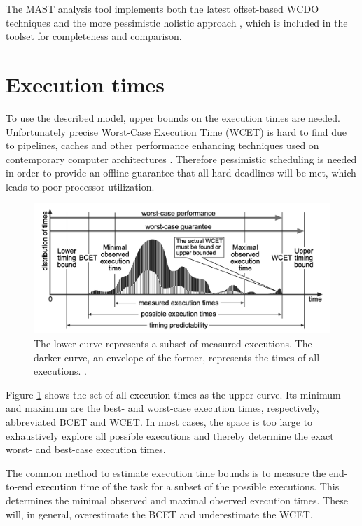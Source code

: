 \documentclass{article}
\begin{document}
The MAST analysis tool implements both the latest offset-based WCDO techniques and the more pessimistic holistic approach \cite{mast}, which is included in the toolset for completeness and comparison.

\section{Execution times}

To use the described model, upper bounds on the execution times are needed. Unfortunately precise Worst-Case Execution Time (WCET) is hard to find due to pipelines, caches and other performance enhancing techniques used on contemporary computer architectures \cite{wcet-problem}. Therefore pessimistic scheduling is needed in order to provide an offline guarantee that all hard deadlines will be met, which leads to poor processor utilization.

\begin{figure}[!htbp]
\centering
\includegraphics[width=5in]{images/wcet}
\caption{The lower curve represents a subset of measured executions. The darker curve, an envelope of the former, represents the times of all executions. \cite{wcet-problem}.}
\label{wcet-curve}
\end{figure}

Figure \ref{wcet-curve} shows the set of all execution times as the upper curve. Its minimum and maximum are the best- and worst-case execution times, respectively, abbreviated BCET and WCET. In most cases, the space is too large to exhaustively explore all possible executions and thereby determine the exact worst- and best-case execution times.

The common method to estimate execution time bounds is to measure the end-to-end execution time of the task for a subset of the possible executions. This determines the minimal observed and maximal observed execution times. These will, in general, overestimate the BCET and underestimate the WCET.
\end{document}
